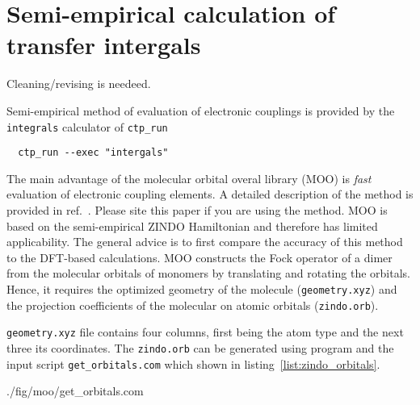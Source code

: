 \section{Semi-empirical calculation of transfer intergals}
\label{sec:moo}

{\color{red} Cleaning/revising is needeed.}


\newcommand{\xyz}{\texttt{geometry.xyz}\xspace}
\newcommand{\orb}{\texttt{zindo.orb}\xspace}

Semi-empirical method of evaluation of electronic couplings is provided by the \texttt{integrals} calculator of \texttt{ctp\_run} 
\begin{verbatim}
  ctp_run --exec "intergals"
\end{verbatim}

The main advantage of the molecular orbital overal library (MOO) is {\em fast} evaluation of electronic coupling elements. A detailed description of the method is provided in ref.~\cite{kirkpatrick_approximate_2008}. Please site this paper if you are using the method.
%
MOO is based on the semi-empirical ZINDO Hamiltonian and therefore has limited applicability. The general advice is to first compare the accuracy of this method to the DFT-based calculations. MOO constructs the Fock operator of a dimer from the  molecular orbitals of monomers by translating and rotating the orbitals. Hence, it requires the optimized geometry of the molecule (\xyz) and the projection coefficients of the molecular on atomic orbitals (\orb). 

\xyz file contains four columns, first being the atom type and the next three its coordinates. The \orb can be generated using \gaussian program and the input script \texttt{get\_orbitals.com} which shown in listing~\ref{list:zindo_orbitals}.

%
{./fig/moo/get_orbitals.com}

